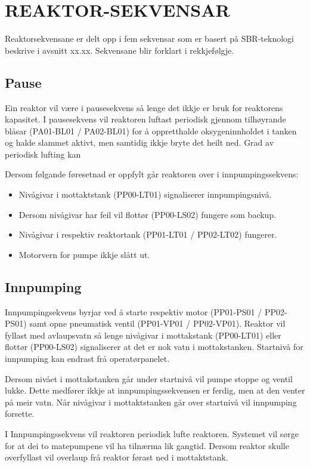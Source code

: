 \newpage
\section{REAKTOR-SEKVENSAR}
Reaktorsekvensane er delt opp i fem sekvensar som er basert på SBR-teknologi beskrive i avsnitt xx.xx.
Sekvensane blir forklart i rekkjefølgje.

\subsection{Pause}
Ein reaktor vil være i pausesekvens så lenge det ikkje er bruk for reaktorens kapasitet. I pausesekvens vil reaktoren luftast periodisk gjennom tilhøyrande blåsar (PA01-BL01 / PA02-BL01) 
for å oppretthalde oksygeninnholdet i tanken og halde slammet aktivt, men samtidig ikkje bryte det heilt ned. Grad av periodisk lufting kan

Dersom følgande føresetnad er oppfylt går reaktoren over i innpumpingssekvens:
\begin{itemize}
    \item Nivågivar i mottaktstank (PP00-LT01) signaliserer innpumpingsnivå.
    \item Dersom nivågivar har feil vil flottør (PP00-LS02) fungere som backup.
    \item Nivågivar i respektiv reaktortank (PP01-LT01 / PP02-LT02) fungerer.
    \item Motorvern for pumpe ikkje slått ut.
\end{itemize}

\subsection{Innpumping}
Innpumpingsekvens byrjar ved å starte respektiv motor (PP01-PS01 / PP02-PS01) samt opne pneumatisk ventil (PP01-VP01 / PP02-VP01). 
Reaktor vil fyllast med avlaupsvatn så lenge nivågivar i mottakstank (PP00-LT01) eller flottør (PP00-LS02) signaliserer at det er nok vatn i mottakstanken. 
Startnivå for innpumping kan endrast frå operatørpanelet.

Dersom nivået i mottakstanken går under startnivå vil pumpe stoppe og ventil lukke. 
Dette medfører ikkje at innpumpingssekvensen er ferdig, men at den venter på meir vatn. 
Når nivågivar i mottaktstanken går over startnivå vil innpumping forsette. 

I Innpumpingssekvens vil reaktoren periodisk lufte reaktoren.
Systemet vil sørge for at dei to matepumpene vil ha tilnærma lik gangtid.
Dersom reaktor skulle overfyllast vil overlaup frå reaktor førast ned i mottaktstank.


